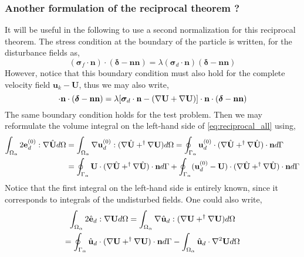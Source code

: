 \subsubsection{Another formulation of the reciprocal theorem ? }
It will be useful in the following to use a second normalization for this reciprocal theorem. 
The stress condition at the boundary of the particle is written, for the disturbance fields as, 
\begin{equation*}
    (\bm\sigma_f\cdot\textbf{n})\cdot (\bm\delta - \textbf{nn})
    = \lambda (\bm\sigma_d\cdot \textbf{n})(\bm\delta - \textbf{nn})
\end{equation*}
However, notice that this boundary condition must also hold for the complete velocity field $\textbf{u}_k - \textbf{U}$, thus we may also write, 
\begin{equation*}
    [\bm\sigma_f
    - (\grad \textbf{U}+\grad \textbf{U})
    ]\cdot \textbf{n}\cdot  (\bm\delta - \textbf{nn})
    = 
    \lambda [\bm\sigma_d\cdot \textbf{n}
    - (\grad \textbf{U}+\grad \textbf{U})
    ]\cdot \textbf{n}\cdot (\bm\delta - \textbf{nn})
\end{equation*}
The same boundary condition holds for the test problem. 
Then we may reformulate the volume integral on the left-hand side of \ref{eq:reciprocal_all} using, 
\begin{align*}
    \int_{\Omega_{\alpha}}  2\textbf{e}_d^{(0)} : \mathbf{\nabla} \hat{\textbf{U}}  d\Omega
    &=\int_{\Omega_{\alpha}}  \mathbf{\nabla} \textbf{u}_d^{(0)} : (\mathbf{\nabla} \hat{\textbf{U}} +^\dagger \mathbf{\nabla} \textbf{U})  d\Omega
    =
    \oint_{\Gamma_{\alpha}}   \textbf{u}_d^{(0)} \cdot (\mathbf{\nabla} \hat{\textbf{U}} + ^\dagger\mathbf{\nabla} \hat{\textbf{U}})  \cdot \textbf{n} d\Gamma\\
    &=
    \oint_{\Gamma_{\alpha}}   \textbf{U} \cdot (\mathbf{\nabla} \hat{\textbf{U}} + ^\dagger\mathbf{\nabla} \hat{\textbf{U}})  \cdot \textbf{n} d\Gamma
    + \oint_{\Gamma_{\alpha}}   (\textbf{u}_d^{(0)} - \textbf{U})\cdot (\mathbf{\nabla} \hat{\textbf{U}} + ^\dagger\mathbf{\nabla} \hat{\textbf{U}})  \cdot \textbf{n} d\Gamma
    \\
\end{align*}
Notice that the first integral on the left-hand side is entirely known, since it corresponds to integrals of the undisturbed fields.
One could also write, 
\begin{multline}
    \int_{\Omega_{\alpha}}  2\hat{\textbf{e}}_d : \mathbf{\nabla} {\textbf{U}}  d\Omega
    =\int_{\Omega_{\alpha}}  \mathbf{\nabla} \hat{\textbf{u}}_d : (\mathbf{\nabla} {\textbf{U}} +^\dagger \mathbf{\nabla} \textbf{U})  d\Omega\\
    =
    \oint_{\Gamma_{\alpha}}   \hat{\textbf{u}}_d \cdot (\mathbf{\nabla} {\textbf{U}} + ^\dagger\mathbf{\nabla} {\textbf{U}})  \cdot \textbf{n} d\Gamma
    -\int_{\Omega_{\alpha}} \hat{\textbf{u}}_d \cdot \mathbf{\nabla}^2 {\textbf{U}}  d\Omega
\end{multline}
